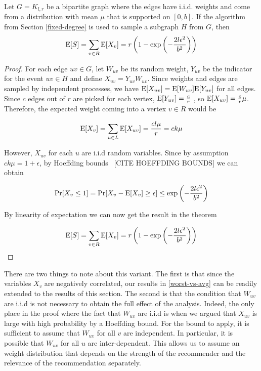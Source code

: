 \begin{thm}
Let $G=K_{l,r}$ be a bipartite graph where the edges have i.i.d. weights and come from a distribution with mean $\mu$ that is supported on $[0,b]$. If the algorithm from Section \ref{fixed-degree} is used to sample a subgraph $H$ from $G$, then
\[ \text{E}[S] = \sum_{v\in R} \text{E}[X_v] = r\left(1-\exp\left(-\frac{2l\epsilon^2}{b^2}\right)\right) \]
\end{thm}

\begin{proof}
For each edge $uv\in G$, let $W_{uv}$ be its random weight, $Y_{uv}$ be
the indicator for the event $uv\in H$ and define $X_{uv} = Y_{uv}
W_{uv}$. Since weights and edges are sampled by independent processes,
we have $\text{E}[X_{uv}] = \text{E}[W_{uv}]\text{E}[Y_{uv}]$ for all edges. Since $c$
edges out of $r$ are picked for each vertex, $\text{E}[Y_{uv}] = \frac{c}{r}$
, so $\text{E}[X_{uv}] = \frac{c}{r}\mu$. Therefore, the expected weight
coming into a vertex $v\in R$ would be 

\[ \text{E}[X_v] = \sum_{u\in L} \text{E}[X_{uv}] = \frac{cl\mu}{r} = ck\mu\]

However, $X_{uv}$ for each $u$ are i.i.d random variables. Since by
assumption $ck\mu = 1+\epsilon$, by Hoeffding bounds~\cite{} [CITE HOEFFDING BOUNDS] we can obtain

\[ \Pr[X_v \leq 1] = \Pr[X_v - \text{E}[X_v] \geq \epsilon] \leq \exp\left(-\frac{2l\epsilon^2}{b^2}\right) \]

By linearity of expectation we can now get the result in the theorem

\[ \text{E}[S] = \sum_{v\in R} \text{E}[X_v] = r\left(1-\exp\left(-\frac{2l\epsilon^2}{b^2}\right)\right) \]
\end{proof}

There are two things to note about this variant. The first is that
since the variables $X_v$ are negatively correlated, our results in
\ref{worst-vs-avg} can be readily extended to the results of this
section. The second is that the condition that $W_{uv}$ are i.i.d
is not necessary to obtain the full effect of the analysis. Indeed,
the only place in the proof where the fact that $W_{uv}$ are i.i.d
is when we argued that $X_{uv}$ is large with high probability by a
Hoeffding bound. For the bound to apply, it is sufficient to assume
that $W_{uv}$ for all $v$ are independent. In particular, it is 
possible that $W_{uv}$ for all $u$ are inter-dependent. This allows
us to assume an weight distribution that depends on the strength of 
the recommender and the relevance of the recommendation separately.
